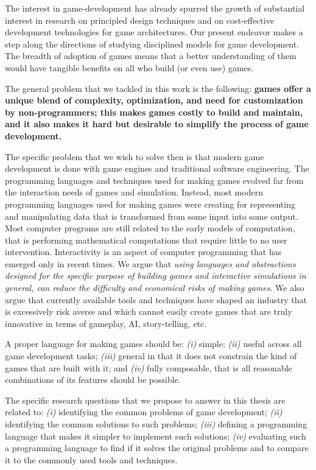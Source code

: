 The interest in game-development has already spurred the growth of substantial interest in research on principled design techniques and on cost-effective development technologies for game architectures. Our present endeavor makes a step along the directions of studying disciplined models for game development. The breadth of adoption of games means that a better understanding of them would have tangible benefits on all who build (or even use) games.

The general problem that we tackled in this work is the following: \textbf{games offer a unique blend of complexity, optimization, and need for customization by non-programmers; this makes games costly to build and maintain, and it also makes it hard but desirable to simplify the process of game development.}

The specific problem that we wish to solve then is that modern game development is done with game engines and traditional software engineering. The programming languages and techniques used for making games evolved far from the interaction needs of games and simulation. Instead, most modern programming languages used for making games were creating for representing and manipulating data that is transformed from some input into some output. Most computer programs are still related to the early models of computation, that is performing mathematical computations that require little to no user intervention. Interactivity is an aspect of computer programming that has emerged only in recent times. We argue that \textit{using languages and abstractions designed for the specific purpose of building games and interactive simulations in general, can reduce the difficulty and economical risks of making games}. We also argue that currently available tools and techniques have shaped an industry that is excessively risk averse and which cannot easily create games that are truly innovative in terms of gameplay, AI, story-telling, etc.

A proper language for making games should be: \textit{(i)} simple; \textit{(ii)} useful across all game development tasks; \textit{(iii)} general in that it does not constrain the kind of games that are built with it; and \textit{(iv)} fully composable, that is all reasonable combinations of its features should be possible.

The specific research questions that we propose to answer in this thesis are related to: \textit{(i)} identifying the common problems of game development; \textit{(ii)} identifying the common solutions to such problems; \textit{(iii)} defining a programming language that makes it simpler to implement such solutions; \textit{(iv)} evaluating such a programming language to find if it solves the original problems and to compare it to the commonly used tools and techniques. 

